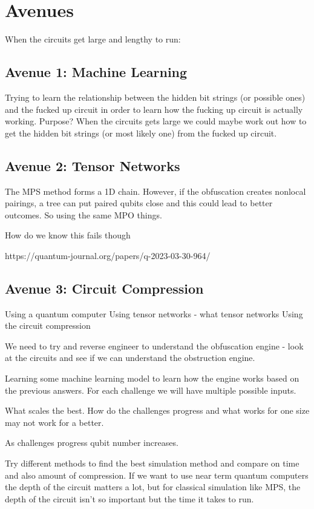 \section{Avenues}

When the circuits get large and lengthy to run:

\subsection{Avenue 1: Machine Learning}

Trying to learn the relationship between the hidden bit strings (or possible ones) and the fucked up circuit in order to learn how the fucking up circuit is actually working. Purpose? When the circuits gets large we could maybe work out how to get the hidden bit strings (or most likely one) from the fucked up circuit.

\subsection{Avenue 2: Tensor Networks}

The MPS method forms a 1D chain. However, if the obfuscation creates nonlocal pairings, a tree can put paired qubits close and this could lead to better outcomes. So using the same MPO things.

How do we know this fails though

https://quantum-journal.org/papers/q-2023-03-30-964/

\subsection{Avenue 3: Circuit Compression}

Using a quantum computer
Using tensor networks - what tensor networks
Using the circuit compression

We need to try and reverse engineer to understand the obfuscation engine - look at the circuits and see if we can understand the obstruction engine. 

Learning some machine learning model to learn how the engine works based on the previous answers. For each challenge we will have multiple possible inputs.

What scales the best. How do the challenges progress and what works for one size may not work for a better.

As challenges progress qubit number increases.

Try different methods to find the best simulation method and compare on time and also amount of compression. If we want to use near term quantum computers the depth of the circuit matters a lot, but for classical simulation like MPS, the depth of the circuit isn't so important but the time it takes to run.


